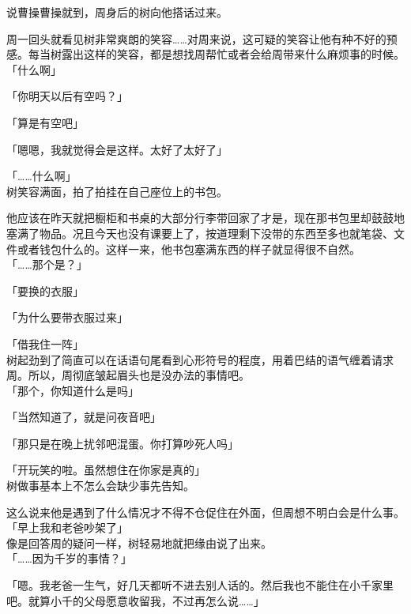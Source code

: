 说曹操曹操就到，周身后的树向他搭话过来。

周一回头就看见树非常爽朗的笑容……对周来说，这可疑的笑容让他有种不好的预感。每当树露出这样的笑容，都是想找周帮忙或者会给周带来什么麻烦事的时候。\\

「什么啊」

「你明天以后有空吗？」

「算是有空吧」

「嗯嗯，我就觉得会是这样。太好了太好了」

「……什么啊」\\

树笑容满面，拍了拍挂在自己座位上的书包。

他应该在昨天就把橱柜和书桌的大部分行李带回家了才是，现在那书包里却鼓鼓地塞满了物品。况且今天也没有课要上了，按道理剩下没带的东西至多也就笔袋、文件或者钱包什么的。这样一来，他书包塞满东西的样子就显得很不自然。\\

「……那个是？」

「要换的衣服」

「为什么要带衣服过来」

「借我住一阵」\\

树起劲到了简直可以在话语句尾看到心形符号的程度，用着巴结的语气缠着请求周。所以，周彻底皱起眉头也是没办法的事情吧。\\

「那个，你知道什么是吗」

「当然知道了，就是问夜音吧」

「那只是在晚上扰邻吧混蛋。你打算吵死人吗」

「开玩笑的啦。虽然想住在你家是真的」\\

树做事基本上不怎么会缺少事先告知。

这么说来他是遇到了什么情况才不得不仓促住在外面，但周想不明白会是什么事。\\

「早上我和老爸吵架了」\\

像是回答周的疑问一样，树轻易地就把缘由说了出来。\\

「……因为千岁的事情？」

「嗯。我老爸一生气，好几天都听不进去别人话的。然后我也不能住在小千家里吧。就算小千的父母愿意收留我，不过再怎么说……」

